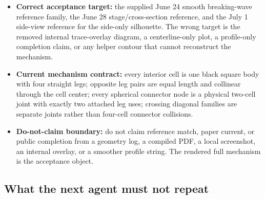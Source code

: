 \documentclass[12pt,letterpaper]{article}
\newcommand{\pathcode}[1]{\nolinkurl{#1}}
\begin{document}
\begin{itemize}
\begin{quote}
  \pathcode{terminalFlatRunFromEightPercent=0.31}\\
  \pathcode{minLowReturnX=0.482}\\
  \pathcode{maxAbruptPostCrestAngleDeg=7.6085}\\
  \pathcode{maxTerminalDescentAngleDeg=81.0851}
  \end{quote}
  Browser screenshots exist in:
  \begin{quote}\footnotesize
  \pathcode{_verification/}\\
  \pathcode{browser-20260701-side-reference-smoothed/}\\
  \pathcode{browser-20260701-side-long-tail/}\\
  \pathcode{browser-20260701-side-rounded-arc/}
  \end{quote}
  These checks prove that the July 1 repair is buildable, has a closed source-level mechanism checker, and is no longer the earlier pointy side-profile candidate. They do not prove exact reference match or live deployment by themselves. The preferred HTTPS subdomain remains certificate-blocked until a fresh certificate check passes.
  \item \textbf{Correct acceptance target:} the supplied June 24 smooth breaking-wave reference family, the June 28 stage/cross-section reference, and the July 1 side-view reference for the side-only silhouette. The wrong target is the removed internal trace-overlay diagram, a centerline-only plot, a profile-only completion claim, or any helper contour that cannot reconstruct the mechanism.
  \item \textbf{Current mechanism contract:} every interior cell is one black square body with four straight legs; opposite leg pairs are equal length and collinear through the cell center; every spherical connector node is a physical two-cell joint with exactly two attached leg uses; crossing diagonal families are separate joints rather than four-cell connector collisions.
  \item \textbf{Do-not-claim boundary:} do not claim reference match, paper current, or public completion from a geometry log, a compiled PDF, a local screenshot, an internal overlay, or a smoother profile string. The rendered full mechanism is the acceptance object.
\end{itemize}

\subsection{What the next agent must not repeat}
\end{document}
